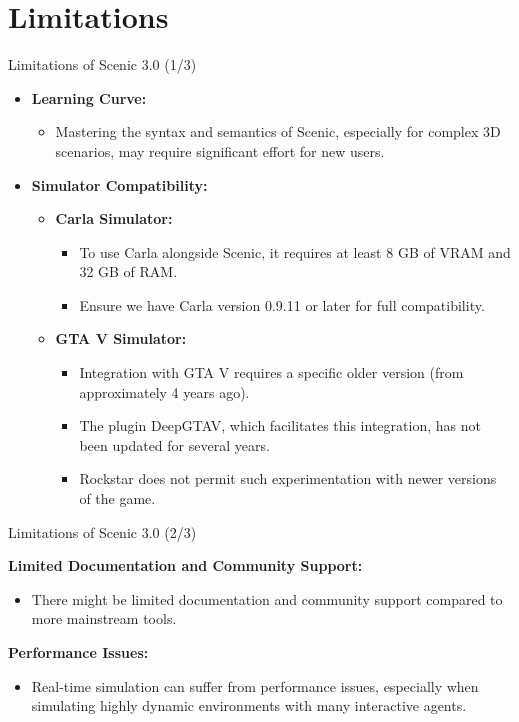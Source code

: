 \documentclass[10pt]{beamer}
\begin{document}
\section{Limitations}
\begin{frame}{Limitations of Scenic 3.0 (1/3)}
  \begin{itemize}
    \item \textbf{Learning Curve:} 
    \begin{itemize}
      \item Mastering the syntax and semantics of Scenic, especially for complex 3D scenarios, may require significant effort for new users.
    \end{itemize}
    \item \textbf{Simulator Compatibility:} 
    \begin{itemize}
      \item \textbf{Carla Simulator:} 
      \begin{itemize}
        \item To use Carla alongside Scenic, it requires at least 8 GB of VRAM and 32 GB of RAM.
        \item Ensure we have Carla version 0.9.11 or later for full compatibility.
          \end{itemize}
      \item \textbf{GTA V Simulator:} 
      \begin{itemize}
        \item Integration with GTA V requires a specific older version (from approximately 4 years ago).
        \item The plugin DeepGTAV, which facilitates this integration, has not been updated for several years.
        \item Rockstar does not permit such experimentation with newer versions of the game.
      \end{itemize}
    \end{itemize}
  \end{itemize}
\end{frame}

\begin{frame}{Limitations of Scenic 3.0 (2/3)}
    \item \textbf{Limited Documentation and Community Support:} 
    \begin{itemize}
      \item There might be limited documentation and community support compared to more mainstream tools.
    \end{itemize}
        \item \textbf{Performance Issues:} 
    \begin{itemize}
      \item Real-time simulation can suffer from performance issues, especially when simulating highly dynamic environments with many interactive agents.
    \end{itemize}
\end{frame}
\end{document}
